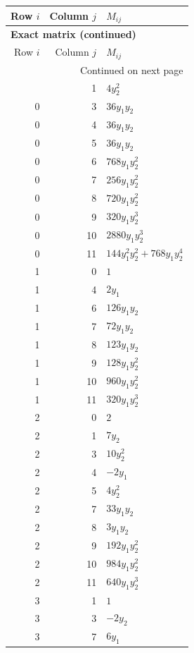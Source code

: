 \documentclass[10pt,a4paper]{article}
\begin{document}
{\small\setlength{\tabcolsep}{7pt}\begin{longtable}{rrp{125mm}}
\toprule Row $i$ & Column $j$ & $M_{ij}$\\\midrule\endfirsthead
\multicolumn{3}{l}{\textbf{Exact matrix (continued)}}\\
\toprule Row $i$ & Column $j$ & $M_{ij}$\\\midrule\endhead
\midrule\multicolumn{3}{r}{Continued on next page}\\\endfoot\bottomrule\endlastfoot
0 & 1 & $4 y_{2}^{2}$\\
0 & 3 & $36 y_{1} y_{2}$\\
0 & 4 & $36 y_{1} y_{2}$\\
0 & 5 & $36 y_{1} y_{2}$\\
0 & 6 & $768 y_{1} y_{2}^{2}$\\
0 & 7 & $256 y_{1} y_{2}^{2}$\\
0 & 8 & $720 y_{1} y_{2}^{2}$\\
0 & 9 & $320 y_{1} y_{2}^{3}$\\
0 & 10 & $2880 y_{1} y_{2}^{3}$\\
0 & 11 & $144 y_{1}^{2} y_{2}^{2} + 768 y_{1} y_{2}^{4}$\\
1 & 0 & $1$\\
1 & 4 & $2 y_{1}$\\
1 & 6 & $126 y_{1} y_{2}$\\
1 & 7 & $72 y_{1} y_{2}$\\
1 & 8 & $123 y_{1} y_{2}$\\
1 & 9 & $128 y_{1} y_{2}^{2}$\\
1 & 10 & $960 y_{1} y_{2}^{2}$\\
1 & 11 & $320 y_{1} y_{2}^{3}$\\
2 & 0 & $2$\\
2 & 1 & $7 y_{2}$\\
2 & 3 & $10 y_{2}^{2}$\\
2 & 4 & $- 2 y_{1}$\\
2 & 5 & $4 y_{2}^{2}$\\
2 & 7 & $33 y_{1} y_{2}$\\
2 & 8 & $3 y_{1} y_{2}$\\
2 & 9 & $192 y_{1} y_{2}^{2}$\\
2 & 10 & $984 y_{1} y_{2}^{2}$\\
2 & 11 & $640 y_{1} y_{2}^{3}$\\
3 & 1 & $1$\\
3 & 3 & $- 2 y_{2}$\\
3 & 7 & $6 y_{1}$\\

\end{longtable}}
\end{document}
